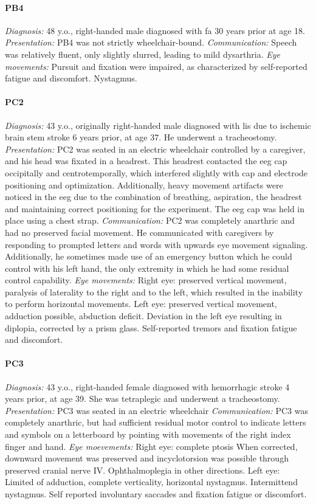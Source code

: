 \paragraph{PB4}
\emph{Diagnosis:} 48 y.o., right-handed male diagnosed with \ac{fa} 30 years
prior at age 18.
\emph{Presentation:} PB4 was not strictly wheelchair-bound.
\emph{Communication:} Speech was relatively fluent, only slightly slurred,
leading to mild dysarthria.
\emph{Eye movements:} Pursuit and fixation were impaired, as characterized by
self-reported fatigue and discomfort. Nystagmus.

\paragraph{PC2}
\emph{Diagnosis:} 43 y.o., originally right-handed male diagnosed with \ac{lis} due to
ischemic brain stem stroke 6 years prior, at age 37. He underwent a tracheostomy.
\emph{Presentation:} PC2 was seated in an electric wheelchair controlled by a
caregiver, and his head was fixated in a headrest.
This headrest contacted the \ac{eeg} cap occipitally and centrotemporally, which
interfered slightly with cap and electrode positioning and optimization.
Additionally, heavy movement artifacts were noticed in the \ac{eeg} due to the
combination of breathing, aspiration, the headrest and maintaining correct
positioning for the experiment.
The \ac{eeg} cap was held in place using a chest strap.
\emph{Communication:} PC2 was completely anarthric and had no preserved facial
movement. He communicated with caregivers by responding to prompted letters and
words with upwards eye movement signaling.
Additionally, he sometimes made use of an emergency button which he could
control with his left hand, the only extremity in which he had some residual
control capability.
\emph{Eye movements:}
Right eye: preserved vertical movement, paralysis of laterality to the right and to the left,
which resulted in the inability to perform horizontal movements.
Left eye: preserved vertical movement, adduction possible, abduction deficit.
Deviation in the left eye resulting in diplopia, corrected by a prism glass.
Self-reported tremors and fixation fatigue and discomfort.

\paragraph{PC3}
\emph{Diagnosis:} 43 y.o., right-handed female diagnosed with hemorrhagic stroke
4 years prior, at age 39. She was tetraplegic and underwent a tracheostomy.
\emph{Presentation:} PC3 was seated in an electric wheelchair
\emph{Communication:} PC3 was completely anarthric, but had sufficient residual
motor control to indicate letters and symbols on a letterboard by pointing with
movements of the right index finger and hand.
\emph{Eye moevements:}
Right eye: complete ptosis
When corrected, downward movement was preserved and incyclotorsion was possible
through preserved cranial nerve IV. Ophthalmoplegia in other directions.
Left eye: Limited of adduction, complete verticality, horizontal nystagmus.
Intermittend nystagmus.
Self reported involuntary saccades and fixation fatigue or discomfort.

